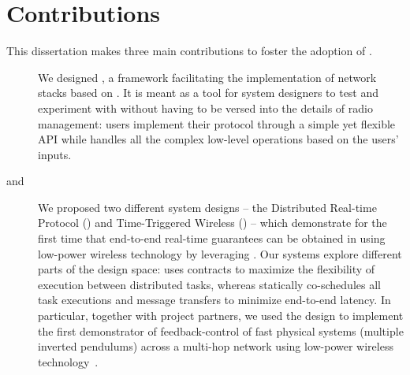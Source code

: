 \section{Contributions}
This dissertation makes three main contributions to foster the adoption of \ST.

\begin{description}

    \item[\baloo]
    We designed \baloo, a framework facilitating the implementation of network stacks based on \ST.
    It is meant as a tool for system designers to test and experiment with \ST without having to be versed into the details of radio management: users implement their protocol through a simple yet flexible API while \baloo handles all the complex low-level operations based on the users' inputs.

    \item[\DRP and \TTW]
    We proposed two different system designs -- the Distributed Real-time Protocol (\DRP) and Time-Triggered Wireless (\TTW) -- which demonstrate for the first time that end-to-end real-time guarantees can be obtained in \CPS using low-power wireless technology by leveraging \ST.
    Our systems explore different parts of the design space:
    \DRP uses contracts to maximize the flexibility of execution between distributed tasks, whereas
    \TTW statically co-schedules all task executions and message transfers to minimize end-to-end latency.
    In particular, together with project partners, we used the \TTW design to implement the first demonstrator of feedback-control of fast physical systems (multiple inverted pendulums) across a multi-hop network using low-power wireless technology~\cite{mager2019Demo}.

    \squarepar{%
      \item[\triscale]
      With the design of \triscale, we worked towards more rigorous and reproducible experimental networking research.
      For the first time, we went beyond simple guidelines and proposed a concrete methodology for designing networking experiments and analyzing their data, which allowed us to propose the first formalized definition of reproducibility in the context of networking experiments.
      The driving principle of \triscale is to rationalize the evaluation process: \ie justify what is required to do and what data to collect in order to support one's performance claims.%
    }


\end{description}

